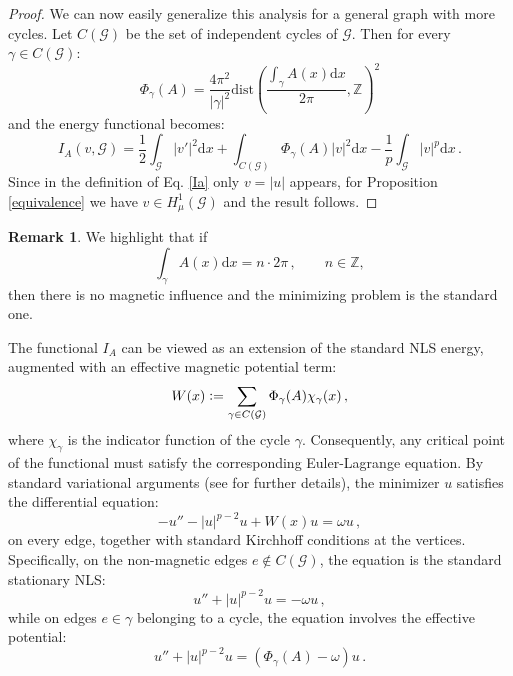 \documentclass[12pt,a4paper]{amsart}
\theoremstyle{definition}
\newtheorem{remark}[definition]{Remark}
\theoremstyle{plain}
\newcommand{\defeq}{\vcentcolon=}
\numberwithin{equation}{section}
\begin{document}
\begin{proof}
\medskip

We can now easily generalize this analysis for a general graph with more cycles. 
Let $C(\mathcal{G})$ be the set of independent cycles of $\mathcal{G}$. Then for every $\gamma \in C(\mathcal{G})$:
\begin{equation}
    \Phi_{\gamma}(A) = \frac{4 \pi^2}{|\gamma|^2} \mathrm{dist}\left( \frac{\int_\gamma A(x) \mathrm{d}x}{2 \pi}, \mathbb{Z} \right)^2
\end{equation}
and the energy functional becomes:
\begin{equation} \label{Ia2}
     I_A(v,\mathcal{G})  = \frac{1}{2}\int_{\mathcal{G}} |v'|^2 \mathrm{d}x + \int_{C(\mathcal{G})}\Phi_{\gamma}(A) |v|^2 \mathrm{d}x - \frac{1}{p} \int_{\mathcal{G}} |v|^p \mathrm{d}x\,.
\end{equation}
Since in the definition of Eq. \eqref{Ia} only $v = |u|$ appears, for Proposition \ref{equivalence} we have $v \in H^1_{\mu}(\mathcal{G})$ and the result follows.
\end{proof}

\begin{remark}
We highlight that if \[
\int_{\gamma} A(x)\mathrm{d}x = n\cdot 2\pi\,, \qquad n\in\mathbb{Z},
\]
then there is no magnetic influence and the minimizing problem is the standard one.
\end{remark}

The functional $I_A$ can be viewed as an extension of the standard NLS energy, augmented with an effective magnetic potential term:
\begin{equation}
W(x) \defeq \sum_{\gamma \in C(\mathcal{G})} \Phi_{\gamma}(A) \chi_{\gamma}(x)\,,
\label{magneticpotential}
\end{equation}
where $\chi_\gamma$ is the indicator function of the cycle $\gamma$. Consequently, any critical point of the functional must satisfy the corresponding Euler-Lagrange equation. By standard variational arguments (see \cite{Adami2015} for further details), the minimizer $u$ satisfies the differential equation:
\begin{equation}
    -u'' - |u|^{p-2}u + W(x)u = \omega u\,,
    \label{eqdiff}
\end{equation}
on every edge, together with standard Kirchhoff conditions at the vertices. Specifically, on the non-magnetic edges $e \notin C(\mathcal{G})$, the equation is the standard stationary NLS:
\begin{equation}
    u'' + |u|^{p-2}u = -\omega u\,,
\end{equation}
while on edges $e \in \gamma$ belonging to a cycle, the equation involves the effective potential:
\begin{equation}
    u'' + |u|^{p-2}u = (\Phi_\gamma(A) - \omega) u\,.
\end{equation}
\end{document}
